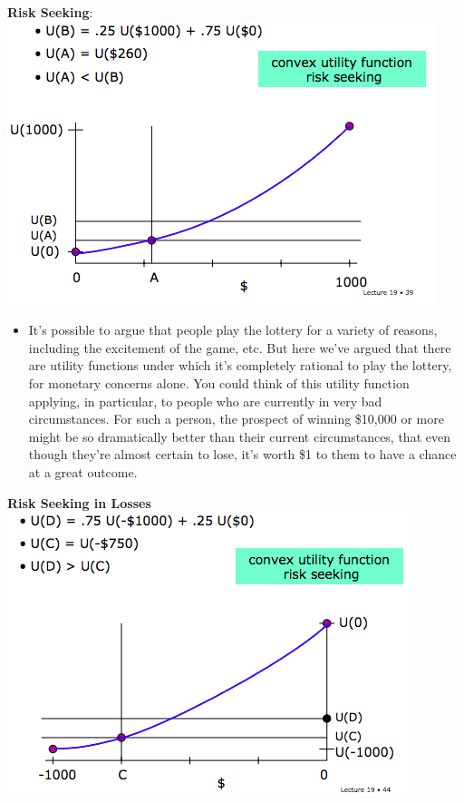 \documentclass[12pt]{article}
\begin{document}
\begin{tcolorbox}
\textbf{Risk Seeking}:\\

\includegraphics[scale=0.5]{p11}\\

\begin{itemize}
\item It's possible to argue that people play the lottery for a variety of reasons,
including the excitement of the game, etc. But here we've argued that there
are utility functions under which it's completely rational to play the lottery, for
monetary concerns alone. You could think of this utility function applying, in
particular, to people who are currently in very bad circumstances. For such
a person, the prospect of winning \$10,000 or more might be so dramatically
better than their current circumstances, that even though they're almost
certain to lose, it's worth \$1 to them to have a chance at a great outcome.
\end{itemize}

\textbf{Risk Seeking in Losses}\\

\includegraphics[scale=0.5]{p12}\\

\end{tcolorbox}
\end{document}
